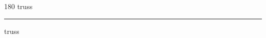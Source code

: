 
\begin{frame}
\begin{center}
\begin{turn}{180}
{\fontsize{2.5cm}{1em}\selectfont truss}
\end{turn}
\vspace{1em}\par  
\hrule
\vspace{1em}\par  
{\fontsize{2.5cm}{1em}\selectfont truss}
\end{center}
\end{frame}
